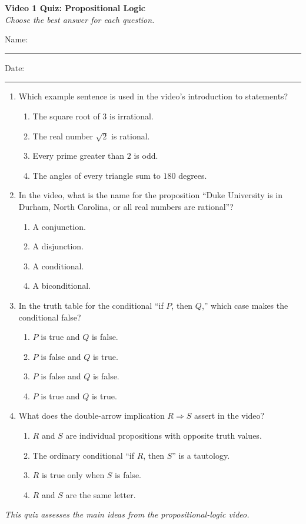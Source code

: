 \documentclass[10pt]{article}
\begin{document}
\begin{center}
  {\large\bfseries Video 1 Quiz: Propositional Logic}\\[0.25em]
  \textit{Choose the best answer for each question.}
\end{center}

\noindent Name:\ \rule{3.2in}{0.4pt}\hfill Date:\ \rule{1.25in}{0.4pt}

\vspace{0.7em}

\begin{enumerate}
  \item Which example sentence is used in the video's introduction to statements?
  \begin{enumerate}
    \item The square root of $3$ is irrational.
    \item The real number $\sqrt{2}$ is rational.
    \item Every prime greater than $2$ is odd.
    \item The angles of every triangle sum to $180$ degrees.
  \end{enumerate}

  \item In the video, what is the name for the proposition ``Duke University is in Durham, North Carolina, or all real numbers are rational''?
  \begin{enumerate}
    \item A conjunction.
    \item A disjunction.
    \item A conditional.
    \item A biconditional.
  \end{enumerate}

  \item In the truth table for the conditional ``if $P$, then $Q$,'' which case makes the conditional false?
  \begin{enumerate}
    \item $P$ is true and $Q$ is false.
    \item $P$ is false and $Q$ is true.
    \item $P$ is false and $Q$ is false.
    \item $P$ is true and $Q$ is true.
  \end{enumerate}

  \item What does the double-arrow implication $R \Rightarrow S$ assert in the video?
  \begin{enumerate}
    \item $R$ and $S$ are individual propositions with opposite truth values.
    \item The ordinary conditional ``if $R$, then $S$'' is a tautology.
    \item $R$ is true only when $S$ is false.
    \item $R$ and $S$ are the same letter.
  \end{enumerate}
\end{enumerate}

\vspace{0.7em}
\noindent\textit{This quiz assesses the main ideas from the propositional-logic video.}
\end{document}
